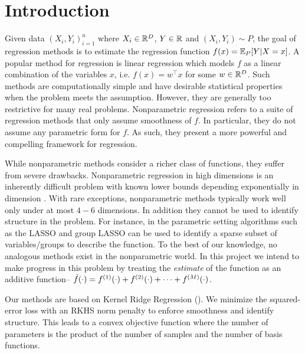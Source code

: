 

\section{Introduction}

Given data $(X_i,Y_i)_{i=1}^n$ where $X_i\in \mathbb{R}^D$, $Y\in\mathbb{R}$ and 
$(X_i,Y_i)\sim P$, the goal of
regression methods is to estimate the regression function $f(x) = \mathbb{E}_P[Y|X=x]$.
A popular method for regression is linear regression which models $f$ as a
linear combination of the variables $x$, i.e. $f(x) = w^\top x$ for some $w \in
\mathbb{R}^D$. Such methods are computationally simple and have desirable
statistical properties when the problem meets the assumption. However, they are generally
too restrictive for many real problems.
Nonparametric regression refers to a suite of regression methods that only
assume smoothness of $f$. In particular, they do not assume any parametric form
for $f$. As such, they present a more powerful and compelling framework for
regression.

While nonparametric methods consider a richer class of functions, they suffer
from severe drawbacks.
Nonparametric regression in high dimensions is an inherently difficult problem with known
lower bounds depending exponentially in dimension
\citep{gyorfi02distributionfree}. 
With rare exceptions,
nonparametric methods typically work well only under at most $4-6$ dimensions.
In addition they cannot be used to identify
structure in the problem. For instance, in the parametric setting algorithms
such as the LASSO and group LASSO can be used to identify a sparse subset of
variables/groups to describe the function. To the best of our knowledge, no
analogous methods exist in the nonparametric world.
In this project we intend to make progress in this problem by treating the
\emph{estimate} of the function as
an additive function-- $\hat{f}(\cdot) = f^{(1)}(\cdot) + f^{(2)}(\cdot) +
\dots + f^{(M)}(\cdot)$.

Our methods are based on Kernel Ridge Regression (\krr).
We minimize the squared-error loss with 
an RKHS norm penalty to enforce smoothness and identify structure.
This leads to a convex objective function where the number of parameters is
the product of the number of samples and the number of basis functions.

